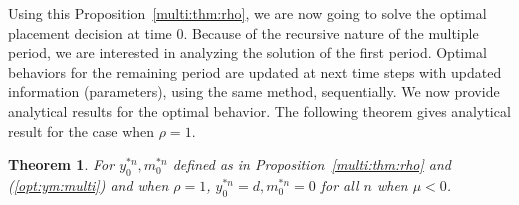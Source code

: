 \documentclass[11pt]{article}
\theoremstyle{plain}
\numberwithin{equation}{section}
\newtheorem{thm}{Theorem}[section]
\newcommand{\Magenta}{\color{Magenta}}
\begin{document}
%
\par Using this Proposition~\ref{multi:thm:rho}, we are now going to solve the optimal placement decision at time $0$. Because of the recursive nature of the multiple period, we are interested in analyzing the solution of the first period. Optimal behaviors for the remaining period are updated at next time steps with updated information (parameters), using the same method, sequentially. We now provide analytical results for the optimal behavior. The following theorem gives analytical result for the case when $\rho=1$.

\begin{thm}\label{Multi:rho1:optimalym}
For $y_0^{*n}, m_0^{*n}$ defined as in Proposition~\ref{multi:thm:rho} and (\ref{opt:ym:multi}) and when $\rho=1$,  $y_0^{*n}=d, m_0^{*n}=0$ for all $n$ when $\mu<0$. 
\end{thm}
\end{document}

